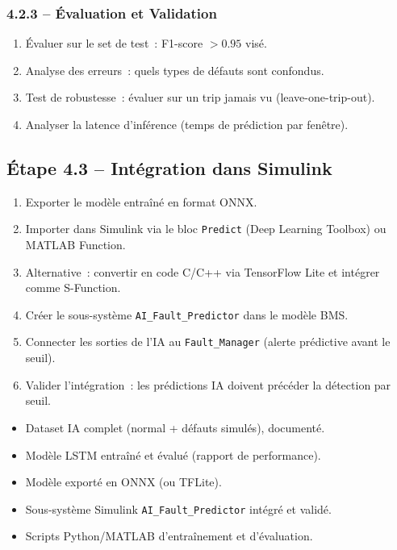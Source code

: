 \documentclass[a4paper,12pt]{article}
\begin{document}
\subsubsection{4.2.3 -- Évaluation et Validation}
\begin{enumerate}[nosep]
  \item Évaluer sur le set de test~: F1-score $>0.95$ visé.
  \item Analyse des erreurs~: quels types de défauts sont confondus.
  \item Test de robustesse~: évaluer sur un trip jamais vu (leave-one-trip-out).
  \item Analyser la latence d'inférence (temps de prédiction par fenêtre).
\end{enumerate}

\subsection{Étape 4.3 -- Intégration dans Simulink}
\begin{enumerate}[nosep]
  \item Exporter le modèle entraîné en format ONNX.
  \item Importer dans Simulink via le bloc \texttt{Predict} (Deep Learning Toolbox) ou MATLAB Function.
  \item Alternative~: convertir en code C/C++ via TensorFlow Lite et intégrer comme S-Function.
  \item Créer le sous-système \texttt{AI\_Fault\_Predictor} dans le modèle BMS.
  \item Connecter les sorties de l'IA au \texttt{Fault\_Manager} (alerte prédictive avant le seuil).
  \item Valider l'intégration~: les prédictions IA doivent précéder la détection par seuil.
\end{enumerate}

\begin{deliverablebox}
\begin{itemize}[nosep]
  \item Dataset IA complet (normal + défauts simulés), documenté.
  \item Modèle LSTM entraîné et évalué (rapport de performance).
  \item Modèle exporté en ONNX (ou TFLite).
  \item Sous-système Simulink \texttt{AI\_Fault\_Predictor} intégré et validé.
  \item Scripts Python/MATLAB d'entraînement et d'évaluation.
\end{itemize}
\end{deliverablebox}
\end{document}
